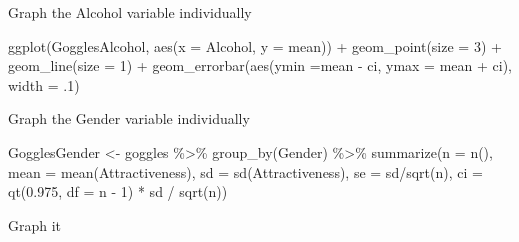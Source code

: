 \documentclass[
]{book}
\newenvironment{Shaded}{\begin{snugshade}}{\end{snugshade}}
\newcommand{\AttributeTok}[1]{\textcolor[rgb]{0.77,0.63,0.00}{#1}}
\newcommand{\DecValTok}[1]{\textcolor[rgb]{0.00,0.00,0.81}{#1}}
\newcommand{\FloatTok}[1]{\textcolor[rgb]{0.00,0.00,0.81}{#1}}
\newcommand{\FunctionTok}[1]{\textcolor[rgb]{0.00,0.00,0.00}{#1}}
\newcommand{\NormalTok}[1]{#1}
\newcommand{\OtherTok}[1]{\textcolor[rgb]{0.56,0.35,0.01}{#1}}
\newcommand{\SpecialCharTok}[1]{\textcolor[rgb]{0.00,0.00,0.00}{#1}}
\begin{document}
Graph the Alcohol variable individually

\begin{Shaded}
\begin{Highlighting}[]
\FunctionTok{ggplot}\NormalTok{(GogglesAlcohol, }\FunctionTok{aes}\NormalTok{(}\AttributeTok{x =}\NormalTok{ Alcohol,}
                                \AttributeTok{y =}\NormalTok{ mean)) }\SpecialCharTok{+}
  \FunctionTok{geom\_point}\NormalTok{(}\AttributeTok{size =} \DecValTok{3}\NormalTok{) }\SpecialCharTok{+}
  \FunctionTok{geom\_line}\NormalTok{(}\AttributeTok{size =} \DecValTok{1}\NormalTok{) }\SpecialCharTok{+}
  \FunctionTok{geom\_errorbar}\NormalTok{(}\FunctionTok{aes}\NormalTok{(}\AttributeTok{ymin  =}\NormalTok{mean }\SpecialCharTok{{-}}\NormalTok{ ci, }
                    \AttributeTok{ymax =}\NormalTok{ mean }\SpecialCharTok{+}\NormalTok{ ci), }
                \AttributeTok{width =}\NormalTok{ .}\DecValTok{1}\NormalTok{)}
\end{Highlighting}
\end{Shaded}

Graph the Gender variable individually

\begin{Shaded}
\begin{Highlighting}[]
\NormalTok{GogglesGender }\OtherTok{\textless{}{-}}\NormalTok{ goggles }\SpecialCharTok{\%\textgreater{}\%}
  \FunctionTok{group\_by}\NormalTok{(Gender) }\SpecialCharTok{\%\textgreater{}\%}
  \FunctionTok{summarize}\NormalTok{(}\AttributeTok{n =} \FunctionTok{n}\NormalTok{(),}
            \AttributeTok{mean =} \FunctionTok{mean}\NormalTok{(Attractiveness),}
            \AttributeTok{sd =} \FunctionTok{sd}\NormalTok{(Attractiveness),}
            \AttributeTok{se =}\NormalTok{ sd}\SpecialCharTok{/}\FunctionTok{sqrt}\NormalTok{(n),}
            \AttributeTok{ci =} \FunctionTok{qt}\NormalTok{(}\FloatTok{0.975}\NormalTok{, }\AttributeTok{df =}\NormalTok{ n }\SpecialCharTok{{-}} \DecValTok{1}\NormalTok{) }\SpecialCharTok{*}\NormalTok{ sd }\SpecialCharTok{/} \FunctionTok{sqrt}\NormalTok{(n))}
\end{Highlighting}
\end{Shaded}

Graph it
\end{document}
